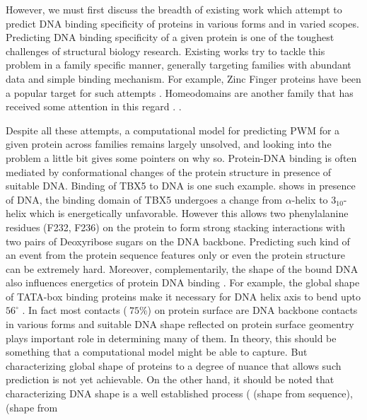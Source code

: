 However, we must first discuss the breadth of existing work which attempt to predict DNA binding
specificity of proteins in various forms and in varied scopes. Predicting DNA binding specificity
of a given protein is one of the toughest challenges of structural biology research. Existing works 
try to tackle this problem in a family specific manner, generally targeting families with abundant data 
and simple binding mechanism. For example, Zinc Finger proteins have been a popular target for such attempts
\citep{persikov2009predicting,molparia2010zif, persikov2014novo,
meseguer2020prediction,aizenshtein2022deepzf}. 
Homeodomains are another family that has received some attention in this regard
\citep{noyes2008analysis, alleyne2009predicting, christensen2012recognition,wetzel2022learning}. .
\par
Despite all these attempts, a computational model for predicting PWM for a given protein across
families remains largely unsolved, and looking into the problem a little bit gives some pointers on
why so. Protein-DNA binding is often mediated by conformational changes of the protein structure in presence of suitable
DNA. Binding of TBX5 to DNA is one such example. \citet{stirnimann2010structural} shows in
presence of DNA, the binding domain of TBX5 undergoes a change from $\alpha$-helix to $3_{10}$-helix
which is energetically unfavorable. However this allows two phenylalanine residues (F232, F236) on
the protein to form strong stacking interactions with two pairs of Deoxyribose sugars on the DNA
backbone. Predicting such kind of an event from the protein sequence features only or even the
protein structure can be extremely hard. Moreover, complementarily, the shape of the bound DNA
also influences energetics of protein DNA binding \citep{rohs2009role, dror2014covariation}. For example, the global shape of TATA-box binding
proteins make it necessary for DNA helix axis to bend upto $56^{\circ}$ \citep{kim1993crystal}. In fact most contacts
($~75\%$) on protein surface are DNA backbone contacts in various forms and suitable DNA shape
reflected on protein
surface geomentry plays important role in determining many of them. In theory, this should be
something that a computational model might be able to capture. But characterizing global shape of
proteins to a degree of nuance that allows such prediction is not yet achievable. On the other hand,
it should be noted that characterizing DNA shape is a well established process
(\citet{zhou2013dnashape} (shape from sequence), \citet{blanchet2011curves+,lu20033dna} (shape from
